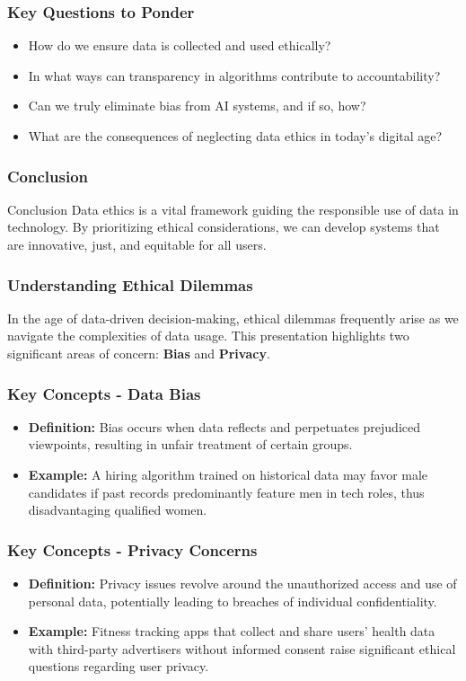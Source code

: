 \documentclass[aspectratio=169]{beamer}
\begin{document}
\begin{frame}[fragile]
    \frametitle{Key Questions to Ponder}
    \begin{itemize}
        \item How do we ensure data is collected and used ethically?
        \item In what ways can transparency in algorithms contribute to accountability?
        \item Can we truly eliminate bias from AI systems, and if so, how?
        \item What are the consequences of neglecting data ethics in today's digital age?
    \end{itemize}
\end{frame}

\begin{frame}[fragile]
    \frametitle{Conclusion}
    \begin{block}{Conclusion}
        Data ethics is a vital framework guiding the responsible use of data in technology. 
        By prioritizing ethical considerations, we can develop systems that are innovative, just, and equitable for all users.
    \end{block}
\end{frame}

\begin{frame}[fragile]
    \frametitle{Understanding Ethical Dilemmas}
    In the age of data-driven decision-making, ethical dilemmas frequently arise as we navigate the complexities of data usage. This presentation highlights two significant areas of concern: \textbf{Bias} and \textbf{Privacy}.
\end{frame}

\begin{frame}[fragile]
    \frametitle{Key Concepts - Data Bias}
    \begin{itemize}
        \item \textbf{Definition:} Bias occurs when data reflects and perpetuates prejudiced viewpoints, resulting in unfair treatment of certain groups.
        \item \textbf{Example:} 
        A hiring algorithm trained on historical data may favor male candidates if past records predominantly feature men in tech roles, thus disadvantaging qualified women.
    \end{itemize}
\end{frame}

\begin{frame}[fragile]
    \frametitle{Key Concepts - Privacy Concerns}
    \begin{itemize}
        \item \textbf{Definition:} Privacy issues revolve around the unauthorized access and use of personal data, potentially leading to breaches of individual confidentiality.
        \item \textbf{Example:} 
        Fitness tracking apps that collect and share users’ health data with third-party advertisers without informed consent raise significant ethical questions regarding user privacy.
    \end{itemize}
\end{frame}
\end{document}
